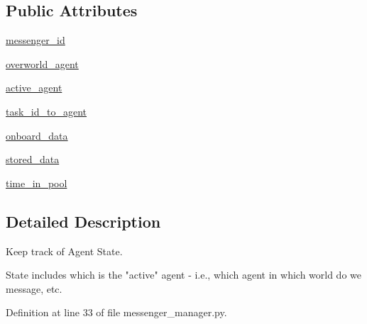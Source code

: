 \subsection*{Public Attributes}
\begin{DoxyCompactItemize}
\item 
\hyperlink{classparlai_1_1chat__service_1_1services_1_1messenger_1_1messenger__manager_1_1AgentState_ae08b5a025e6c6dbc13d69fb51cfc88ae}{messenger\+\_\+id}
\item 
\hyperlink{classparlai_1_1chat__service_1_1services_1_1messenger_1_1messenger__manager_1_1AgentState_a8a15c91823a40220f26bcea350841515}{overworld\+\_\+agent}
\item 
\hyperlink{classparlai_1_1chat__service_1_1services_1_1messenger_1_1messenger__manager_1_1AgentState_a0ab28992a20b4b8993f8a2d6df3eb3bc}{active\+\_\+agent}
\item 
\hyperlink{classparlai_1_1chat__service_1_1services_1_1messenger_1_1messenger__manager_1_1AgentState_a7221b618c3844e6b36b941b97acab338}{task\+\_\+id\+\_\+to\+\_\+agent}
\item 
\hyperlink{classparlai_1_1chat__service_1_1services_1_1messenger_1_1messenger__manager_1_1AgentState_a53cf27770ebc465d86a4d26b6b4ec9dd}{onboard\+\_\+data}
\item 
\hyperlink{classparlai_1_1chat__service_1_1services_1_1messenger_1_1messenger__manager_1_1AgentState_a4e82195a00afcbe9275c0004d61febad}{stored\+\_\+data}
\item 
\hyperlink{classparlai_1_1chat__service_1_1services_1_1messenger_1_1messenger__manager_1_1AgentState_a703c9594c7532b0badaef268001f1ba2}{time\+\_\+in\+\_\+pool}
\end{DoxyCompactItemize}


\subsection{Detailed Description}
\begin{DoxyVerb}Keep track of Agent State.

State includes which is the "active" agent - i.e., which agent in which
world do we message, etc.
\end{DoxyVerb}
 

Definition at line 33 of file messenger\+\_\+manager.\+py.



